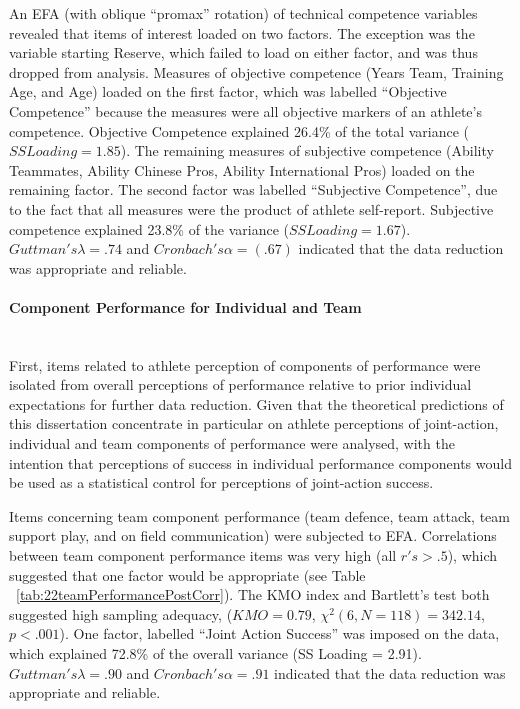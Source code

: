 \documentclass[12pt]{report}
\newcommand{\myparagraph}[1]{\paragraph{#1}\mbox{}\\}
\begin{document}
{An EFA (with oblique ``promax'' rotation) of technical competence variables revealed that items of interest loaded on two factors. The exception was the variable starting Reserve, which failed to load on either factor, and was thus dropped from analysis. Measures of objective competence (Years Team, Training Age, and Age) loaded on the first factor, which was labelled ``Objective Competence'' because the measures were all objective markers of an athlete's competence.  Objective Competence explained 26.4\% of the total variance ($SS Loading = 1.85$). The remaining measures of subjective competence (Ability Teammates, Ability Chinese Pros, Ability International Pros) loaded on the remaining factor.  The second factor was labelled ``Subjective Competence'', due to the fact that all measures were the product of athlete self-report.  Subjective competence explained 23.8\% of the variance ($SS Loading = 1.67$). $Guttman's \lambda =.74$ and $Cronbach's \alpha = (.67)$ indicated that the data reduction was appropriate and reliable.



\myparagraph{Component Performance for Individual and Team}
First, items related to athlete perception of components of performance were isolated from overall perceptions of performance relative to prior individual expectations for further data reduction. Given that the theoretical predictions of this dissertation concentrate in particular on athlete perceptions of joint-action, individual and team components of performance were analysed, with the intention that perceptions of success in individual performance components would be used as a statistical control for perceptions of joint-action success.

Items concerning team component performance (team defence, team attack, team support play, and on field communication) were subjected to EFA.  Correlations between team component performance items was very high (all $r's > .5$), which suggested that one factor would be appropriate (see Table ~\ref{tab:22teamPerformancePostCorr}). The KMO index and Bartlett's test both suggested high sampling adequacy, ($KMO = 0.79$, $\chi^2(6, N = 118) = 342.14$, $p < .001$).  One factor, labelled ``Joint Action Success'' was imposed on the data, which explained 72.8\% of the overall variance (SS Loading = 2.91). $Guttman's \lambda =.90$ and $Cronbach's \alpha = .91$ indicated that the data reduction was appropriate and reliable.


}
\end{document}

